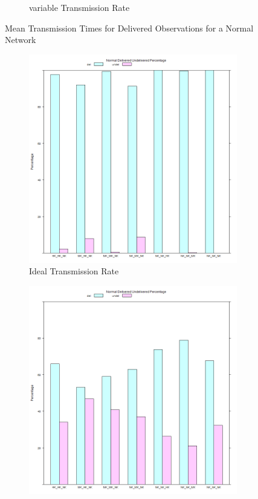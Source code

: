 \begin{figure}
\begin{subfigure}{\textwidth}
  \caption{variable Transmission Rate}
	\label{fig:sim:res:norm:variable:delmean}
\end{subfigure}
\caption{Mean Transmission Times for Delivered Observations for a Normal Network}
\end{figure}

\begin{figure}[H]
\centering
\begin{subfigure}{.5\textwidth}
  \centering
\includegraphics[width=\linewidth]{Chap7/figures/plots/normal_ideal/delvsundel_percent.png}
  \caption{Ideal Transmission Rate}
\label{fig:sim:res:norm:ideal:delundel}
\end{subfigure}%
\begin{subfigure}{.5\textwidth}
  \centering
	\includegraphics[width=\linewidth]{Chap7/figures/plots/normal_variable/delvsundel_percent.png}

\end{subfigure}
\end{figure}
